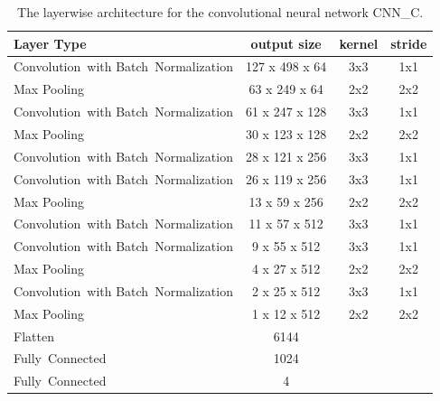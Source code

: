     
  \begin{table}[]
  \centering
  \begin{tabularx}{\textwidth}{Xccc}
  \toprule
Layer Type                                          & output size    & kernel & stride  \\ \midrule
\mbox{Convolution with} \mbox{Batch Normalization}  & 127 x 498 x 64  & 3x3    & 1x1     \\ 
Max Pooling                                         & 63 x 249 x 64   & 2x2    & 2x2     \\ 
\mbox{Convolution with} \mbox{Batch Normalization}  & 61 x 247 x 128  & 3x3    & 1x1     \\ 
Max Pooling                                         & 30 x 123 x 128  & 2x2    & 2x2     \\ 
\mbox{Convolution with} \mbox{Batch Normalization}  & 28 x 121 x 256  & 3x3    & 1x1     \\ 
\mbox{Convolution with} \mbox{Batch Normalization}  & 26 x 119 x 256  & 3x3    & 1x1     \\ 
Max Pooling                                         & 13 x 59 x 256   & 2x2    & 2x2     \\ 
\mbox{Convolution with} \mbox{Batch Normalization}  & 11 x 57 x 512   & 3x3    & 1x1     \\ 
\mbox{Convolution with} \mbox{Batch Normalization}  & 9 x 55 x 512    & 3x3    & 1x1     \\ 
Max Pooling                                         & 4 x 27 x 512    & 2x2    & 2x2     \\ 
\mbox{Convolution with} \mbox{Batch Normalization}  & 2 x 25 x 512    & 3x3    & 1x1     \\ 
Max Pooling                                         & 1 x 12 x 512    & 2x2    & 2x2     \\ 
Flatten                                             & 6144            &        &         \\                        
\mbox{Fully Connected}                              & 1024            &        &         \\
\mbox{Fully Connected}                              & 4               &        &         \\
  \bottomrule
  \end{tabularx}
  \caption{The layerwise architecture for the convolutional neural network CNN\_C.}
  \label{tab:layers_CNN_C}
  \end{table} 
    

